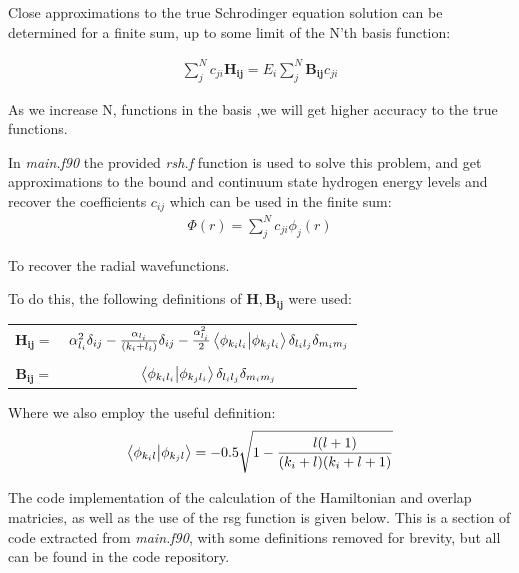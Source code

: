 \documentclass{article}
\renewcommand{\vec}[1]{\mathbf{#1}}
\begin{document}
    Close approximations to the true Schrodinger equation solution can be determined for a finite sum, up to some limit of the N'th basis function:
    
	\large
	\begin{gather}
		\sum_{j}^{N}c_{ji}\vec{H_{ij}} = E_i\sum_{j}^{N}\vec{B_{ij}}c_{ji}
	\end{gather}
	\normalsize
	
	As we increase N, functions in the basis ,we will get higher accuracy to the true functions. 
	
	In \textit{main.f90} the provided \textit{rsh.f} function is used to solve this problem, and get approximations to the bound and continuum state hydrogen energy levels and recover the coefficients $c_{ij}$ which can be used in the finite sum:
	\large
	\begin{gather}
		\Phi(r) = \sum_{j}^{N} c_{ji} \phi_j(r)
	\end{gather}
 	\normalsize
 	
 	To recover the radial wavefunctions.
 	
 	To do this, the following definitions of $\vec{H}, \vec{B_{ij}}$ were used:
 	
	\large
	\begin{center}
		\begin{tabular}{cc}
		$\vec{H_{ij}} =$ 	& $ \alpha_{l_i}^2\delta_{ij}    - \frac{\alpha_{l_i}}{(k_i + l_i)}\delta_{ij} -  \frac{\alpha_{l_i}^2}{2}\braket{\phi_{k_il_i}}{\phi_{k_jl_i}} \delta_{l_il_j} \delta_{m_im_j}$ \\
		& \\
		$\vec{B_{ij}} =$	& $\braket{\phi_{k_il_i}}{\phi_{k_jl_i}} \delta_{l_il_j} \delta_{m_im_j}$\\
		\end{tabular}
	\end{center}
	\normalsize
	
	Where we also employ the useful definition:
	\large
	\begin{gather}
		\braket{\phi_{k_il}}{\phi_{k_jl}} = -0.5\sqrt{1-\frac{l(l+1)}{(k_i+l)(k_i+l+1)}}
	\end{gather}
	\normalsize
	
	The code implementation of the calculation of the Hamiltonian and overlap matricies, as well as the use of the rsg function is given below. This is a section of code extracted from \textit{main.f90}, with some definitions removed for brevity, but all can be found in the code repository. 
	
\end{document}
